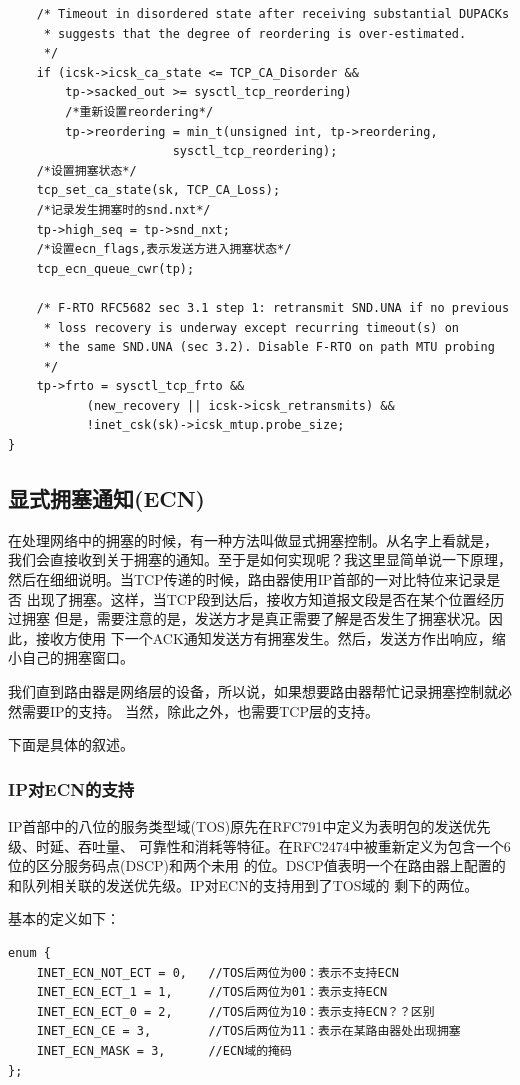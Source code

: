 \begin{verbatim}
	/* Timeout in disordered state after receiving substantial DUPACKs
	 * suggests that the degree of reordering is over-estimated.
	 */
	if (icsk->icsk_ca_state <= TCP_CA_Disorder &&
	    tp->sacked_out >= sysctl_tcp_reordering)
		/*重新设置reordering*/
		tp->reordering = min_t(unsigned int, tp->reordering,
				       sysctl_tcp_reordering);
	/*设置拥塞状态*/	
	tcp_set_ca_state(sk, TCP_CA_Loss);
	/*记录发生拥塞时的snd.nxt*/
	tp->high_seq = tp->snd_nxt;
	/*设置ecn_flags,表示发送方进入拥塞状态*/	
	tcp_ecn_queue_cwr(tp);

	/* F-RTO RFC5682 sec 3.1 step 1: retransmit SND.UNA if no previous
	 * loss recovery is underway except recurring timeout(s) on
	 * the same SND.UNA (sec 3.2). Disable F-RTO on path MTU probing
	 */
	tp->frto = sysctl_tcp_frto &&
		   (new_recovery || icsk->icsk_retransmits) &&
		   !inet_csk(sk)->icsk_mtup.probe_size;
}
\end{verbatim}

	\subsection{显式拥塞通知(ECN)}
		在处理网络中的拥塞的时候，有一种方法叫做显式拥塞控制。从名字上看就是，
		我们会直接收到关于拥塞的通知。至于是如何实现呢？我这里显简单说一下原理，
		然后在细细说明。当TCP传递的时候，路由器使用IP首部的一对比特位来记录是否
		出现了拥塞。这样，当TCP段到达后，接收方知道报文段是否在某个位置经历过拥塞
		但是，需要注意的是，发送方才是真正需要了解是否发生了拥塞状况。因此，接收方使用
		下一个ACK通知发送方有拥塞发生。然后，发送方作出响应，缩小自己的拥塞窗口。

		我们直到路由器是网络层的设备，所以说，如果想要路由器帮忙记录拥塞控制就必然需要IP的支持。
		当然，除此之外，也需要TCP层的支持。

		下面是具体的叙述。

		\subsubsection{IP对ECN的支持}

			IP首部中的八位的服务类型域(TOS)原先在RFC791中定义为表明包的发送优先级、时延、吞吐量、
			可靠性和消耗等特征。在RFC2474中被重新定义为包含一个6位的区分服务码点(DSCP)和两个未用
			的位。DSCP值表明一个在路由器上配置的和队列相关联的发送优先级。IP对ECN的支持用到了TOS域的
			剩下的两位。

			基本的定义如下：
\begin{verbatim}
enum {
	INET_ECN_NOT_ECT = 0,	//TOS后两位为00：表示不支持ECN
	INET_ECN_ECT_1 = 1,		//TOS后两位为01：表示支持ECN
	INET_ECN_ECT_0 = 2,		//TOS后两位为10：表示支持ECN？？区别
	INET_ECN_CE = 3,		//TOS后两位为11：表示在某路由器处出现拥塞
	INET_ECN_MASK = 3,		//ECN域的掩码
};
\end{verbatim}


